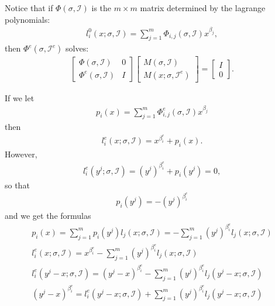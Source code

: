 \documentclass{article}
\theoremstyle{case}
\newcommand{\bidx}{{\mathcal I}}
\newcommand{\ridx}{{\mathcal I^e}}
\begin{document}
Notice that if $\Phi(\sigma, \bidx)$ is the $m \times m$ matrix determined by the lagrange polynomials:
\begin{align*}
l_i^0(x; \sigma, \bidx) = \sum_{j=1}^m \Phi_{i, j}(\sigma, \bidx) x^{\beta_j},
\end{align*}
then $\Phi^e(\sigma, \ridx)$ solves:
\begin{align*}
\begin{bmatrix}
\Phi(\sigma, \bidx) & 0 \\
\Phi^e(\sigma, \bidx) & I
\end{bmatrix}
\begin{bmatrix}
M(\sigma, \bidx) \\
M(x; \sigma, \ridx)
\end{bmatrix}
=
\begin{bmatrix}
I \\ 0
\end{bmatrix}.
\end{align*}

If we let 
\begin{align*}
p_i(x) = \sum_{j=1}^m \Phi^e_{i, j}(\sigma, \bidx) x^{\beta_j}
\end{align*}
then
\begin{align*}
l_i^e(x; \sigma, \bidx) = x^{\beta_i^e} + p_i(x).
\end{align*}
However, 
\begin{align*}
l_i^e(y^j; \sigma, \bidx) = \left(y^j\right)^{\beta_i^e} + p_i(y^j) = 0,
\end{align*}
so that
\begin{align*}
p_i(y^j) = -\left(y^j\right)^{\beta_i^e}
\end{align*}
and we get the formulas
\begin{align}
p_i(x) = \sum_{j=1}^m p_i(y^j) l_j(x; \sigma, \bidx) = -\sum_{j=1}^m \left(y^j\right)^{\beta_i^e} l_j(x; \sigma, \bidx) \nonumber \\
l_i^e(x; \sigma, \bidx) = x^{\beta_i^e} -\sum_{j=1}^m \left(y^j\right)^{\beta_i^e} l_j(x; \sigma, \bidx) \nonumber \\
l_i^e(y^j - x; \sigma, \bidx) = \left(y^j - x\right)^{\beta_i^e} -\sum_{j=1}^m \left(y^j\right)^{\beta_i^e} l_j(y^j - x; \sigma, \bidx) \nonumber \\
\left(y^j - x\right)^{\beta_i^e} = l_i^e(y^j - x; \sigma, \bidx) + \sum_{j=1}^m \left(y^j\right)^{\beta_i^e} l_j(y^j - x; \sigma, \bidx) \label{the_formula}
\end{align}
\end{document}
